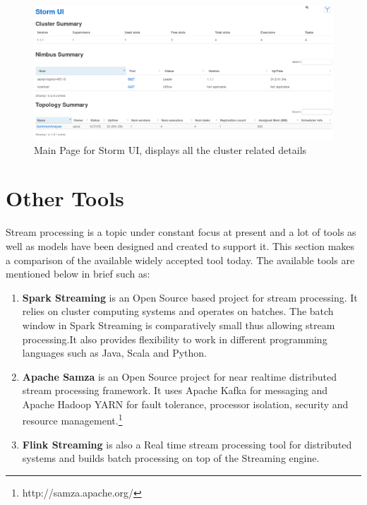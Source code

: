 \documentclass[runningheads,a4paper]{llncs}[2015/06/24]
\begin{document}
\begin{figure}
  \begin{center}
    \includegraphics[width=\textwidth]{ui-mainpage.png}
    \caption{Main Page for Storm UI, displays all the cluster related details}
    \label{fig:stormui}
   \end{center}
\end{figure}

\section{Other Tools}
 \label{sec:othertools}
Stream processing is a topic under constant focus at present and a lot of tools as well as models have been designed and created to support it. This section makes a comparison of the available widely accepted tool today. The available tools are mentioned below in brief such as:
 
 \begin{enumerate}
 \item \textbf{Spark Streaming} is an Open Source based project for stream processing.  It relies on cluster computing systems and operates on batches. The batch window in Spark Streaming is comparatively small thus allowing stream processing.It also provides flexibility to work in different programming languages such as Java, Scala and Python.
 \item \textbf{Apache Samza} is an Open Source project for near realtime distributed stream processing framework. It uses Apache Kafka for messaging and Apache Hadoop YARN for fault tolerance, processor isolation, security and resource management.\footnote{http://samza.apache.org/}
 \item \textbf{Flink Streaming} is also a Real time stream processing tool for distributed systems and builds batch processing on top of the Streaming engine.
 \end{enumerate}
 
\end{document}

